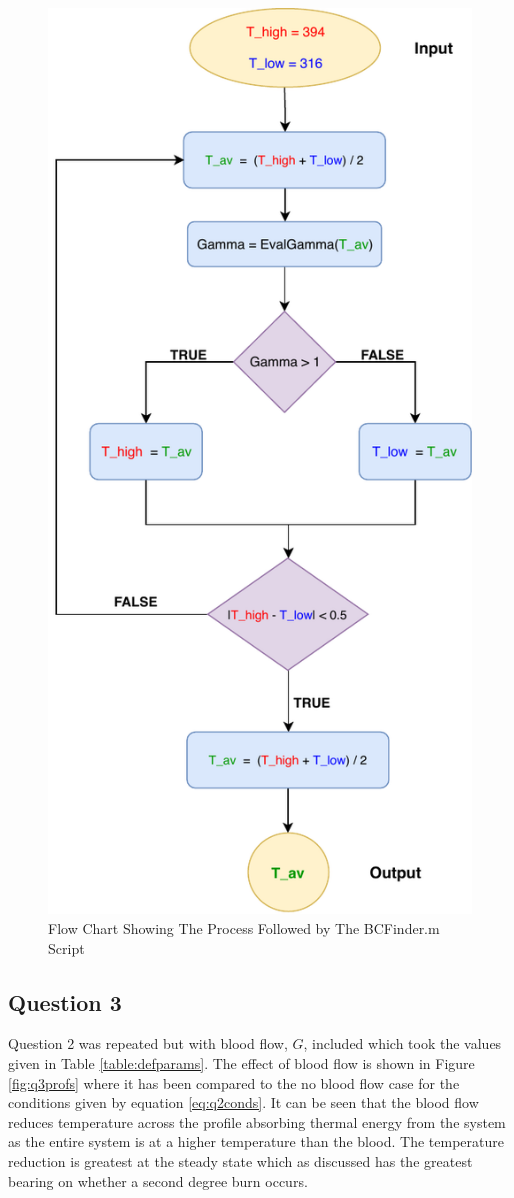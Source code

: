 \documentclass[11pt]{article}
\begin{document}
\begin{figure}[ht]  %
	\centering
	\includegraphics[width=.6\textwidth]{FindBC.pdf}
    \caption{Flow Chart Showing The Process Followed by The BCFinder.m Script}\label{fig:BCflowchart}
\end{figure}

\FloatBarrier
\subsection{Question 3}

Question 2 was repeated but with blood flow, $G$, included which took the values given in Table \ref{table:defparams}. The effect of blood flow is shown in Figure \ref{fig:q3profs} where it has been compared to the no blood flow case for the conditions given by equation \eqref{eq:q2conds}. It can be seen that the blood flow reduces temperature across the profile absorbing thermal energy from the system as the entire system is at a higher temperature than the blood. The temperature reduction is greatest at the steady state which as discussed has the greatest bearing on whether a second degree burn occurs. 
\end{document}
